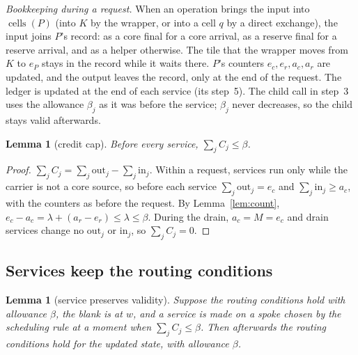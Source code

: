 \documentclass[11pt]{amsart}
\newtheorem{lemma}[theorem]{Lemma}
\theoremstyle{definition}
\newcommand{\cells}{\operatorname{cells}}
\begin{document}
\emph{Bookkeeping during a request.} When an operation brings the input into $\cells(P)$ (into $K$ by the wrapper, or into
a cell $q$ by a direct exchange), the input joins $P$'s record: as a core final for a core arrival, as a reserve final for
a reserve arrival, and as a helper otherwise. The tile that the wrapper moves from $K$ to $e_P$ stays in the record while it
waits there. $P$'s counters $e_c,e_r,a_c,a_r$ are updated, and the output leaves the record, only at the end of the request.
The ledger is updated at the end of each service (its step~5). The child call in step~3 uses the allowance $\beta_j$ as it
was before the service; $\beta_j$ never decreases, so the child stays valid afterwards.

\begin{lemma}[credit cap]\label{lem:cap}
Before every service, $\sum_jC_j\le\beta$.
\end{lemma}

\begin{proof}
$\sum_jC_j=\sum_j\mathrm{out}_j-\sum_j\mathrm{in}_j$. Within a request, services run only while the carrier is not a core source,
so before each service $\sum_j\mathrm{out}_j=e_c$ and $\sum_j\mathrm{in}_j\ge a_c$, with the counters as before the request. By
Lemma~\ref{lem:count}, $e_c-a_c=\lambda+(a_r-e_r)\le\lambda\le\beta$. During the drain, $a_c=M=e_c$ and drain services change no $\mathrm{out}_j$
or $\mathrm{in}_j$, so $\sum_jC_j=0$.
\end{proof}

\subsection{Services keep the routing conditions}

\begin{lemma}[service preserves validity]\label{lem:servvalid}
Suppose the routing conditions hold with allowance $\beta$, the blank is at $w$, and a service is made on a spoke chosen by the
scheduling rule at a moment when $\sum_jC_j\le\beta$. Then afterwards the routing conditions hold for the updated state, with
allowance $\beta$.
\end{lemma}
\end{document}
